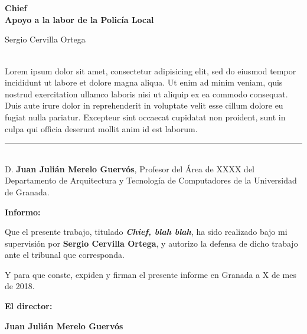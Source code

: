 \chapter*{}
\thispagestyle{empty}

\begin{center}
{\large\bfseries Chief \\ Apoyo a la labor de la Policía Local}\\
\end{center}
\begin{center}
Sergio Cervilla Ortega\\
\end{center}


\\

Lorem ipsum dolor sit amet, consectetur adipisicing elit, sed do eiusmod tempor incididunt ut labore et dolore magna aliqua. Ut enim ad minim veniam, quis nostrud exercitation ullamco laboris nisi ut aliquip ex ea commodo consequat. Duis aute irure dolor in reprehenderit in voluptate velit esse cillum dolore eu fugiat nulla pariatur. Excepteur sint occaecat cupidatat non proident, sunt in culpa qui officia deserunt mollit anim id est laborum.

\cleardoublepage

\thispagestyle{empty}

\noindent\rule[-1ex]{\textwidth}{2pt}\\[4.5ex]

D. \textbf{Juan Julián Merelo Guervós}, Profesor del Área de XXXX del Departamento de Arquitectura y Tecnología de Computadores de la Universidad de Granada.

\vspace{0.5cm}

\textbf{Informo:}

\vspace{0.5cm}

Que el presente trabajo, titulado \textit{\textbf{Chief, blah blah}},
ha sido realizado bajo mi supervisión por \textbf{Sergio Cervilla Ortega}, y autorizo la defensa de dicho trabajo ante el tribunal
que corresponda.

\vspace{0.5cm}

Y para que conste, expiden y firman el presente informe en Granada a X de mes de 2018.

\vspace{1cm}

\textbf{El director: }

\vspace{5cm}

\noindent \textbf{Juan Julián Merelo Guervós}
